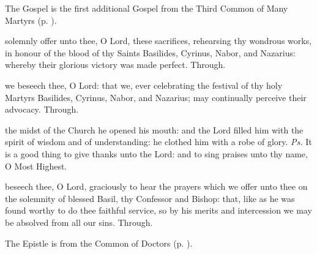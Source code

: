 \begin{rubric}
	The Gospel is the first additional Gospel from the Third Common of Many Martyrs (p. \pageref{Matthew243}).
\end{rubric}


\secret
{} solemnly offer unto thee, O Lord, these sacrifices, rehearsing thy wondrous works, in honour of the blood of thy Saints Basilides, Cyrinus, Nabor, and Nazarius: whereby their glorious victory was made perfect. Through.

\clearpage
{}

\postcommunion
{} we beseech thee, O Lord: that we, ever celebrating the festival of thy holy Martyrs Basilides, Cyrinus, Nabor, and Nazarius; may continually perceive their advocacy. Through.



\introit
{} the midst of the Church he opened his mouth: and the Lord filled him with the spirit of wisdom and of understanding: he clothed him with a robe of glory. \textit{Ps.} It is a good thing to give thanks unto the Lord: and to sing praises unto thy name, O Most Highest.

\collect
{} beseech thee, O Lord, graciously to hear the prayers which we offer unto thee on the solemnity of blessed Basil, thy Confessor and Bishop: that, like as he was found worthy to do thee faithful service, so by his merits and intercession we may be absolved from all our sins. Through.

\begin{rubric}
	The Epistle is from the Common of Doctors (p. \pageref{2Timothy41}).
\end{rubric}


